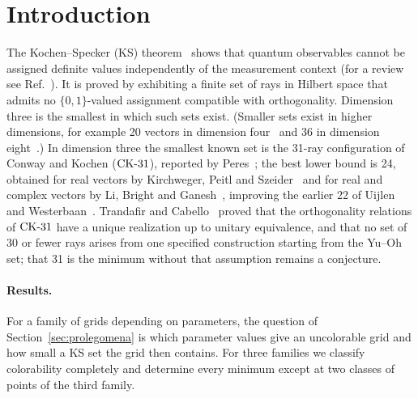 \section{Introduction}\label{sec:intro}

The Kochen--Specker (KS) theorem~\cite{KochenSpecker1967} shows that quantum observables cannot
be assigned definite values independently of the measurement context (for a review see
Ref.~\cite{Budroni2022}).  It is proved by exhibiting a finite set of rays in Hilbert space that
admits no $\{0,1\}$-valued assignment compatible with orthogonality.  Dimension three is the
smallest in which such sets exist.  (Smaller sets exist in higher dimensions, for example 20
vectors in dimension four~\cite{Kernaghan1994} and 36 in dimension
eight~\cite{KernaghanPeres1995}.)  In dimension three the smallest known set is the 31-ray
configuration of Conway and Kochen ($\mathrm{CK}\text{-}31$), reported by Peres~\cite{Peres1993}; the best lower
bound is 24, obtained for real vectors by Kirchweger, Peitl and
Szeider~\cite{KirchwegerPeitlSzeider2023} and for real and complex vectors by Li, Bright and
Ganesh~\cite{LiBrightGanesh2024}, improving the earlier 22 of Uijlen and
Westerbaan~\cite{UijlenWesterbaan2016}.  Trandafir and Cabello~\cite{TrandafirCabello2025} proved
that the orthogonality relations of $\mathrm{CK}\text{-}31$ have a unique realization up to unitary equivalence,
and that no set of 30 or fewer rays arises from one specified construction starting from the
Yu--Oh set; that 31 is the minimum without that assumption remains a conjecture.

\paragraph{Results.}
For a family of grids depending on parameters, the question of Section~\ref{sec:prolegomena} is
which parameter values give an uncolorable grid and how small a KS set the grid then contains.  For three families we
classify colorability completely and determine every minimum except at two classes of points of
the third family.

